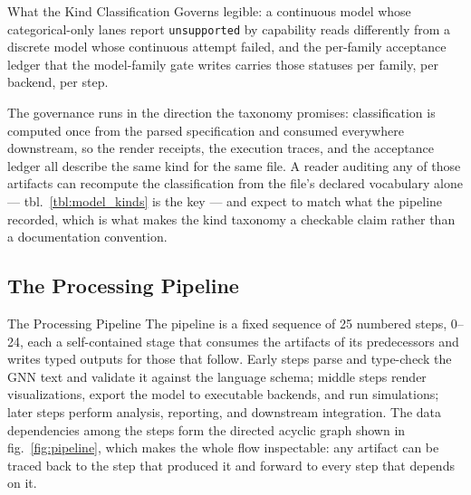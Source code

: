 \documentclass[
  ignorenonframetext,
]{beamer}
\begin{document}
\begin{frame}{What the Kind Classification
Governs}
legible: a continuous model whose categorical-only lanes report
\texttt{unsupported} by capability reads differently from a discrete
model whose continuous attempt failed, and the per-family acceptance
ledger that the model-family gate writes carries those statuses per
family, per backend, per step.

The governance runs in the direction the taxonomy promises:
classification is computed once from the parsed specification and
consumed everywhere downstream, so the render receipts, the execution
traces, and the acceptance ledger all describe the same kind for the
same file. A reader auditing any of those artifacts can recompute the
classification from the file's declared vocabulary alone ---
tbl.~\ref{tbl:model_kinds} is the key --- and expect to match what the
pipeline recorded, which is what makes the kind taxonomy a checkable
claim rather than a documentation convention.
\end{frame}

\subsection{The Processing Pipeline}\label{the-processing-pipeline}

\begin{frame}{The Processing Pipeline}
The pipeline is a fixed sequence of 25 numbered steps, 0--24, each a
self-contained stage that consumes the artifacts of its predecessors and
writes typed outputs for those that follow. Early steps parse and
type-check the GNN text and validate it against the language schema;
middle steps render visualizations, export the model to executable
backends, and run simulations; later steps perform analysis, reporting,
and downstream integration. The data dependencies among the steps form
the directed acyclic graph shown in fig.~\ref{fig:pipeline}, which makes
the whole flow inspectable: any artifact can be traced back to the step
that produced it and forward to every step that depends on it.

\end{frame}
\end{document}
